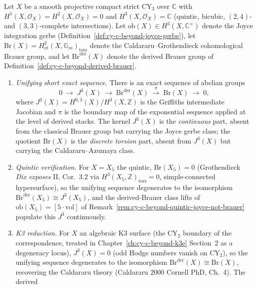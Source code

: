 \begin{conjecture}
\label{thm:cy-c-beyond-derived-brauer-unification}
\ClaimStatusConjectured
Let $X$ be a smooth projective compact strict CY$_3$ over $\mathbb{C}$
with $H^1(X, \mathcal{O}_X) = H^2(X, \mathcal{O}_X) = 0$ and
$H^3(X, \mathcal{O}_X) = \mathbb{C}$ (quintic, bicubic, $(2,4)$- and
$(3,3)$-complete intersections). Let $\mathrm{ob}(X) \in H^3(X,
\mathbb{C}^\times)$ denote the Joyce integration gerbe
(Definition~\ref{def:cy-c-beyond-joyce-gerbe}), let $\mathrm{Br}(X) =
H^2_{\mathrm{et}}(X, \mathbb{G}_m)_{\mathrm{tors}}$ denote the
Caldararu--Grothendieck cohomological Brauer group, and let
$\mathrm{Br}^{\mathrm{der}}(X)$ denote the derived Brauer group of
Definition~\ref{def:cy-c-beyond-derived-brauer}.
\begin{enumerate}
 \item[(i)] \emph{Unifying short exact sequence.} There is an exact
 sequence of abelian groups
 \[
 0 \;\longrightarrow\; J^3(X) \;\longrightarrow\;
 \mathrm{Br}^{\mathrm{der}}(X) \;\xrightarrow{\;\pi\;}\;
 \mathrm{Br}(X) \;\longrightarrow\; 0,
 \]
 where $J^3(X) = H^{0,3}(X)/H^3(X, \mathbb{Z})$ is the Griffiths
 intermediate Jacobian and $\pi$ is the boundary map of the
 exponential sequence applied at the level of derived stacks. The
 kernel $J^3(X)$ is the \emph{continuous} part, absent from the
 classical Brauer group but carrying the Joyce gerbe class; the
 quotient $\mathrm{Br}(X)$ is the \emph{discrete torsion} part,
 absent from $J^3(X)$ but carrying the Caldararu--Azumaya class.
 \item[(ii)] \emph{Quintic verification.} For $X = X_5$ the quintic,
 $\mathrm{Br}(X_5) = 0$ (Grothendieck \emph{Dix exposes} II, Cor.~3.2
 via $H^3(X_5, \mathbb{Z})_{\mathrm{tors}} = 0$, simple-connected
 hypersurface), so the unifying sequence degenerates to the
 isomorphism
 $\mathrm{Br}^{\mathrm{der}}(X_5) \cong J^3(X_5)$, and
 the derived-Brauer class lifts of $\mathrm{ob}(X_5) = [5 \cdot
 \mathrm{vol}]$ of Remark~\ref{rem:cy-c-beyond-quintic-joyce-not-brauer}
 populate this $J^3$ continuously.
 \item[(iii)] \emph{K3 reduction.} For $X$ an algebraic K3 surface
 (the CY$_2$ boundary of the correspondence, treated in
 Chapter~\ref{ch:cy-c-beyond-k3e} Section~2 as a
 degeneracy locus), $J^3(X) = 0$ (odd Hodge numbers vanish on CY$_2$),
 so the unifying sequence degenerates to the isomorphism
 $\mathrm{Br}^{\mathrm{der}}(X) \cong \mathrm{Br}(X)$, recovering the
 Caldararu theory (Caldararu 2000 Cornell PhD, Ch.~4). The derived

\end{enumerate}
\end{conjecture}
